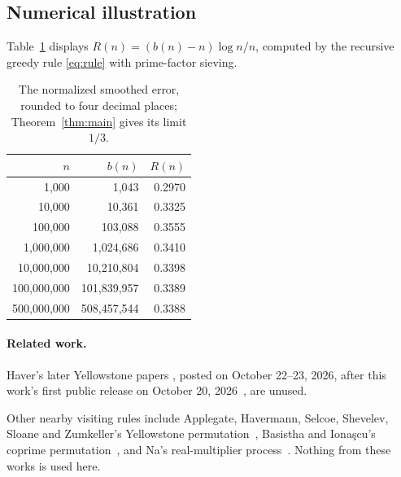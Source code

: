 \documentclass[11pt]{article}
\theoremstyle{remark}
\begin{document}
\begin{appendices}
\section{Numerical illustration}\label{sec:numerics}
Table~\ref{tab:ratio} displays $R(n)=(b(n)-n)\log n/n$, computed by the
recursive greedy rule \eqref{eq:rule} with prime-factor sieving.
\begin{table}[ht]
\centering
\begin{tabular}{r r r}
$n$ & $b(n)$ & $R(n)$\\\hline
1,000 & 1,043 & 0.2970 \\
10,000 & 10,361 & 0.3325 \\
100,000 & 103,088 & 0.3555 \\
1,000,000 & 1,024,686 & 0.3410 \\
10,000,000 & 10,210,804 & 0.3398 \\
100,000,000 & 101,839,957 & 0.3389 \\
500,000,000 & 508,457,544 & 0.3388 \\
\end{tabular}
\caption{The normalized smoothed error, rounded to four decimal places; Theorem~\ref{thm:main} gives its limit $1/3$.}\label{tab:ratio}
\end{table}

\paragraph{Related work.}
Haver's later Yellowstone papers \cite{haverY3,haverYFrontier,haverY6,haverY7,haverY8},
posted on October 22--23, 2026, after this work's first public release on
October 20, 2026~\cite{v1}, are unused.

\end{appendices}
\clearpage
Other nearby visiting rules include Applegate, Havermann, Selcoe,
Shevelev, Sloane and Zumkeller's Yellowstone permutation~\cite{yellowstoneOriginal},
Basistha and Iona\c{s}cu's coprime permutation~\cite{basisthaIonascu}, and
Na's real-multiplier process~\cite{naVisiting}. Nothing from these works is used here.
\end{document}
